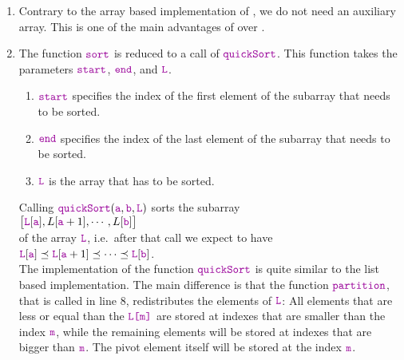 \begin{enumerate}
\item Contrary to the array based implementation of , we do not need an auxiliary
      array.  This is one of the main advantages of  over .
\item The function $\mytt{sort}$ is reduced to a call of $\mytt{quickSort}$.  This function
      takes the parameters $\mytt{start}$, $\mytt{end}$, and $\mytt{L}$.  
      \begin{enumerate}
      \item $\mytt{start}$ specifies the index of the first element of the subarray that needs to be
            sorted.
      \item $\mytt{end}$ specifies the index of the last element of the subarray that needs to be
            sorted. 
      \item $\mytt{L}$ is the array that has to be sorted.
      \end{enumerate}
      Calling $\mytt{quickSort}(\mytt{a}, \mytt{b}, \mytt{L})$ sorts the subarray \\[0.2cm]
      \hspace*{1.3cm} 
      $\bigl[\mytt{L}[\mytt{a}], L[\mytt{a}+1], \cdots, L[\mytt{b}]\bigr]$
      \\[0.2cm]
      of the array $\mytt{L}$, i.e.~after that call we expect to have\\[0.2cm]
      \hspace*{1.3cm} 
      $\mytt{L}[\mytt{a}] \preceq \mytt{L}[\mytt{a}+1] \preceq \cdots \preceq \mytt{L}[\mytt{b}]$.
      \\[0.2cm]
      The implementation of the function $\mytt{quickSort}$
      is quite similar to the list based implementation.  The main difference is that the function
      $\mytt{partition}$, that is called in line 8, redistributes the elements of $\mytt{L}$:
      All elements that are less or equal than the  $\mytt{L[m]}$
      are stored at indexes that are smaller than the index $\mytt{m}$, while the remaining elements will 
      be stored at indexes that are bigger than $\mytt{m}$.  The pivot element itself will be stored at the
      index $\mytt{m}$. 
\end{enumerate}
\pagebreak

